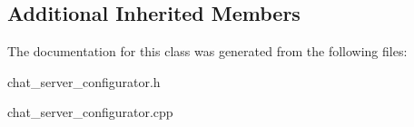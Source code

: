 \subsection*{Additional Inherited Members}


The documentation for this class was generated from the following files\+:\begin{DoxyCompactItemize}
\item 
chat\+\_\+server\+\_\+configurator.\+h\item 
chat\+\_\+server\+\_\+configurator.\+cpp\end{DoxyCompactItemize}
